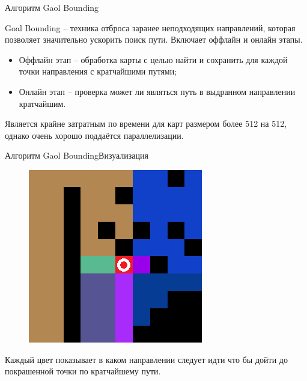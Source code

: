 \documentclass{beamer}
\begin{document}
\begin{frame}{Алгоритм Gaol Bounding}{}

Goal Bounding -- техника отброса заранее неподходящих направлений, которая позволяет значительно ускорить поиск пути. Включает оффлайн и онлайн этапы. 

\begin{itemize}
    \item Оффлайн этап -- обработка карты с целью найти и сохранить для каждой точки направления с кратчайшими путями;
    \item Онлайн этап -- проверка может ли являться путь в выдранном направлении кратчайшим.
\end{itemize}

Является крайне затратным по времени для карт размером более 512 на 512, однако очень хорошо поддаётся параллелизации.

\end{frame}

\begin{frame}{Алгоритм Gaol Bounding}{Визуализация}

\begin{figure}
    \centering
    \includegraphics[width=0.5\linewidth]{goal_bound_visualisation.png}
\end{figure}


Каждый цвет показывает в каком направлении следует идти что бы дойти до покрашенной точки по кратчайшему пути.
\end{frame}
\end{document}
